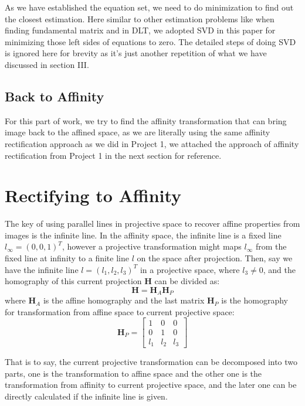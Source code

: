 \documentclass[conference]{IEEEtran}
\newcommand{\mat}[1]{\mathbf{#1}} %
\begin{document}
As we have established the equation set, we need to do minimization to find out the closest estimation. Here similar to other estimation problems like when finding fundamental matrix and in DLT, we adopted SVD in this paper for minimizing those left sides of equations to zero. The detailed steps of doing SVD is ignored here for brevity as it's just another repetition of what we have discussed in section III.

\subsection{Back to Affinity}
For this part of work, we try to find the affinity transformation that can bring image back to the affined space, as we are literally using the same affinity rectification approach as we did in Project 1, we attached the approach of affinity rectification from Project 1 in the next section for reference.

\section{Rectifying to Affinity}
The key of using parallel lines in projective space to recover affine properties from images is the infinite line. In the affinity space, the infinite line is a fixed line $l_{\infty} = (0, 0, 1)^T$, however a projective transformation might maps $l_{\infty}$ from the fixed line at infinity to a finite line $l$ on the space after projection. Then, say we have the infinite line $l = (l_1, l_2, l_3)^T$ in a projective space, where $l_3\neq 0$, and the homography of this current projection $\mat{H}$ can be divided as:
\begin{equation}
	\mat{H}=\mat{H}_A\mat{H}_P
\end{equation}
\noindent where $\mat{H}_A$ is the affine homography and the last matrix $\mat{H}_P$ is the homography for transformation from affine space to current projective space:
\begin{equation}
	\mat{H}_P = 
	\begin{bmatrix}
		1 & 0 & 0 \\
		0 & 1 & 0 \\
		l_1 &  l_2 & l_3
	\end{bmatrix}
\end{equation}

\noindent That is to say, the current projective transformation can be decomposed into two parts, one is the transformation to affine space and the other one is the transformation from affinity to current projective space, and the later one can be directly calculated if the infinite line is given.
\end{document}
